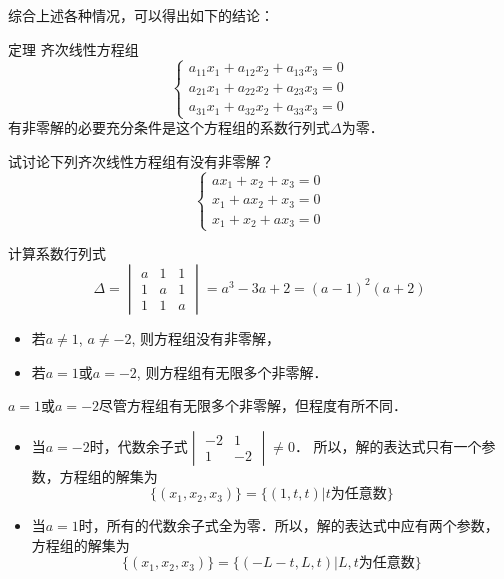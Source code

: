 综合上述各种情况，可以得出如下的结论： 



\begin{blk}{定理}
齐次线性方程组
\[\begin{cases}
    a_{11}x_1+a_{12}x_2+a_{13}x_3=0\\
a_{21}x_1+a_{22}x_2+a_{23}x_3=0\\
a_{31}x_1+a_{32}x_2+a_{33}x_3=0
\end{cases}\]
有非零解的必要充分条件是这个方程组的系数行列式$\Delta$为零．
\end{blk}

\begin{example}
试讨论下列齐次线性方程组有没有非零解？
\[\begin{cases}
    ax_1+x_2+x_3=0\\
    x_1+ax_2+x_3=0\\
    x_1+x_2+ax_3=0
\end{cases}
    \]
\end{example}

\begin{solution}
    计算系数行列式
\[\Delta=\begin{vmatrix}
    a&1&1\\1&a&1\\1&1&a
\end{vmatrix}=a^3-3a+2=(a-1)^2 (a+2)\]

\begin{itemize}
    \item 若$a\ne 1$, $a\ne-2$, 则方程组没有非零解，
    \item 若$a=1$或$a=-2$, 则方程组有无限多个非零解．
\end{itemize}
\end{solution}

\begin{rmk}
    $a=1$或$a=-2$尽管方程组有无限多个非零解，但程度有所不同．
\begin{itemize}
    \item 当$a=-2$时，代数余子式$\begin{vmatrix}
        -2&1\\1&-2
    \end{vmatrix}\ne 0$．
    所以，解的表达式只有一个参数，方程组的解集为$$\{(x_1,x_2,x_3)\}=\{(1,t,t)|\text{$t$为任意数}\}$$
    
    \item  当$a=1$时，所有的代数余子式全为零．所以，解的表达式中应有两个参数，方程组的解集为
    $$\{(x_1,x_2,x_3)\}=\{(-L-t,L,t)|\text{$L,t$为任意数}\}$$
\end{itemize}
\end{rmk}

